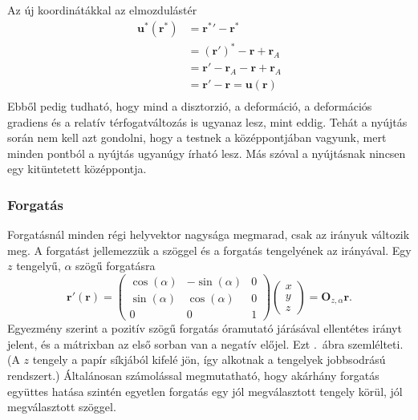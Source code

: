 \documentclass[12pt,a4paper]{scrartcl}
\let\mathbf\bm
\begin{document}
Az új koordinátákkal az elmozdulástér
\[\begin{aligned}
  {{\mathbf{u}}^ * }\left( {{{\mathbf{r}}^ * }} \right) &  = {{\mathbf{r}}^ * }' - {{\mathbf{r}}^ * } \\ 
   &  = {\left( {{\mathbf{r}}'} \right)^ * } - {\mathbf{r}} + {{\mathbf{r}}_A} \\ 
   &  = {\mathbf{r}}' - {{\mathbf{r}}_A} - {\mathbf{r}} + {{\mathbf{r}}_A} \\ 
   &  = {\mathbf{r}}' - {\mathbf{r}} = {\mathbf{u}}\left( {\mathbf{r}} \right) \\ 
\end{aligned} \]
Ebből pedig tudható, hogy mind a disztorzió, a deformáció, a deformációs gradiens és a relatív térfogatváltozás is ugyanaz lesz, mint eddig. Tehát a nyújtás során nem kell azt gondolni, hogy a testnek a középpontjában vagyunk, mert minden pontból a nyújtás ugyanúgy írható lesz. Más szóval a nyújtásnak nincsen egy kitüntetett középpontja.
\normalsize

\subsubsection{Forgatás} \label{section:forgatas}
Forgatásnál minden régi helyvektor nagysága megmarad, csak az irányuk változik meg. A forgatást jellemezzük a szöggel és a forgatás tengelyének az irányával. Egy $z$ tengelyű, $\alpha$ szögű forgatásra
\[{\mathbf{r}}'\left( {\mathbf{r}} \right) = \left( {\begin{array}{*{20}{c}}
  {\cos \left( \alpha  \right)}&{ - \sin \left( \alpha  \right)}&0 \\ 
  { \sin \left( \alpha  \right)}&{\cos \left( \alpha  \right)}&0 \\ 
  0&0&1 
\end{array}} \right)\left( {\begin{array}{*{20}{c}}
  x \\ 
  y \\ 
  z 
\end{array}} \right) = {{\mathbf{O}}_{z,\alpha }}{\mathbf{r}}.\]
Egyezmény szerint a pozitív szögű forgatás óramutató járásával ellentétes irányt jelent, és a mátrixban az első sorban van a negatív előjel. Ezt \az{\ref{fig:eltolas}}.\ ábra szemlélteti. (A $z$ tengely a papír síkjából kifelé jön, így alkotnak a tengelyek jobbsodrású rendszert.) Általánosan számolással megmutatható, hogy akárhány forgatás együttes hatása szintén egyetlen forgatás egy jól megválasztott tengely körül, jól megválasztott szöggel.
\end{document}
